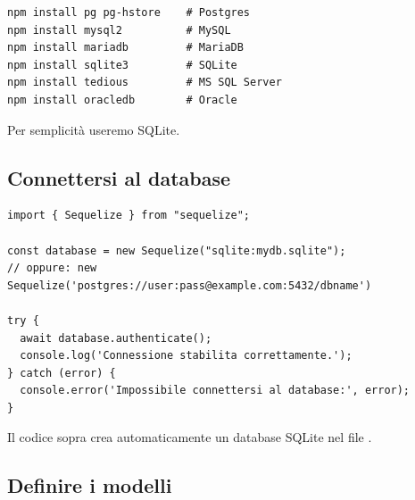 \begin{lstlisting}[style=shell]
npm install pg pg-hstore    # Postgres
npm install mysql2          # MySQL
npm install mariadb         # MariaDB
npm install sqlite3         # SQLite
npm install tedious         # MS SQL Server
npm install oracledb        # Oracle
\end{lstlisting}

Per semplicità useremo SQLite.

\subsection{Connettersi al database}

\begin{affianco}[0.6][c]
\codicepiccolo
\begin{lstlisting}[style=js, name=Database.js]
import { Sequelize } from "sequelize";

const database = new Sequelize("sqlite:mydb.sqlite");
// oppure: new Sequelize('postgres://user:pass@example.com:5432/dbname')

try {
  await database.authenticate();
  console.log('Connessione stabilita correttamente.');
} catch (error) {
  console.error('Impossibile connettersi al database:', error);
}
\end{lstlisting}
\risultato
\begin{immagine}
\end{immagine}
\end{affianco}

Il codice sopra crea automaticamente un database SQLite nel file
.

\subsection{Definire i modelli}

